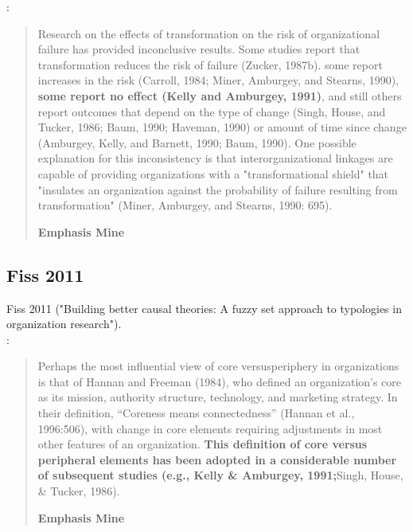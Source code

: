\cite[p.194]{baum1991institutional}:\\
\begin{quote}
Research on the effects of transformation on the risk of organizational failure has provided inconclusive results. Some studies report that transformation reduces the risk of failure (Zucker, 1987b). some report increases in the risk (Carroll, 1984; Miner, Amburgey, and Stearns, 1990), \textbf{some report no effect (Kelly and Amburgey, 1991)}, and still others report outcomes that depend on the type of change (Singh, House, and Tucker, 1986; Baum, 1990; Haveman, 1990) or amount of time since change (Amburgey, Kelly, and Barnett, 1990; Baum, 1990). One possible explanation for this inconsistency is that interorganizational linkages are capable of providing organizations with a "transformational shield" that "insulates an organization against the probability of failure resulting from transformation" (Miner, Amburgey, and Stearns, 1990: 695).
\begin{flushright}
\textbf{Emphasis Mine}
\end{flushright}
\end{quote}

\subsection{Fiss 2011}

Fiss 2011 \cite{fiss2011building} ("Building better causal theories: A fuzzy set approach to typologies in organization research").\\

\cite[p.397]{fiss2011building}:\\
\begin{quote}
Perhaps the most influential view of core versusperiphery  in  organizations  is  that  of  Hannan  and Freeman  (1984),  who  defined  an  organization’s core as its mission, authority structure, technology, and marketing strategy. In their definition, “Coreness  means  connectedness”  (Hannan  et  al.,  1996:506),  with  change  in  core  elements  requiring  adjustments in most other features of an organization. \textbf{This definition of core versus peripheral elements has been adopted in a considerable number of subsequent  studies  (e.g.,  Kelly  \&  Amburgey,  1991;}Singh, House, \& Tucker, 1986).
\begin{flushright}
\textbf{Emphasis Mine}
\end{flushright}
\end{quote}

